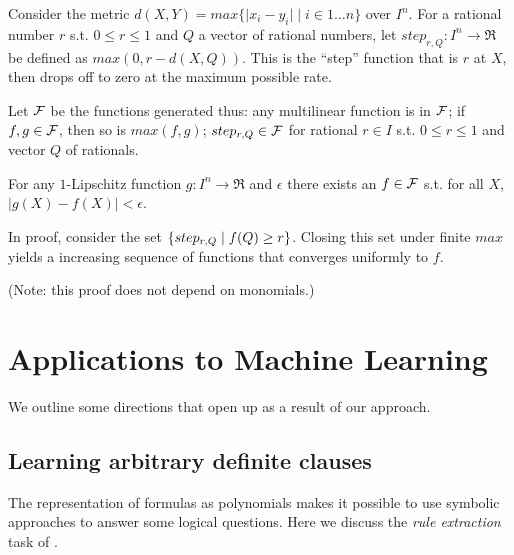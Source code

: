 \documentclass{article} %
\begin{document}
Consider the metric \(d(X,Y) = max \{\lvert x_i - y_i \rvert \mid i\in 1\ldots n \}\) over \(I^n\). For a 
rational number \(r\) s.t. \(0 \leq r \leq 1\) and \(Q\) a vector of rational numbers, let \(step_{r,Q}:I^n \rightarrow \Re\) be defined as \(max(0, r-d(X,Q))\). This is the ``step'' function that is \(r\) at \(X\), then drops off to zero at the maximum possible rate. 

\begin{definition}
  Let \(\cal F\) be the functions generated thus: any multilinear function is in \(\cal F\); if \(f,g \in {\cal F}\), then so is \(max(f,g)\); \(step_{r,Q} \in {\cal F}\) for rational \(r \in I\) s.t. \(0 \leq r \leq 1\) and vector \(Q\) of rationals.
\end{definition}

\begin{theorem}
  For any \(1\)-Lipschitz function \(g:I^n \rightarrow \Re\) and \(\epsilon\) there exists an \(f \in {\cal F}\) s.t. for all \(X\), \(\lvert g(X)-f(X) \rvert \lt \epsilon\).
\end{theorem}
In proof, consider the set \(\{ step_{r,Q} \alt f(Q) \ge r \}\). Closing this set under finite \(max\) yields a increasing sequence of functions that converges uniformly to \(f\).

(Note: this proof does not depend on monomials.)

\section{Applications to Machine Learning}


We outline some directions that open up as a result of our approach.

\subsection{Learning arbitrary definite clauses}
The representation of formulas as polynomials makes it possible to use symbolic approaches to answer some logical questions. Here we discuss the {\em rule extraction} task of \cite[Algorithm 1]{bishan-iclr15}.
\end{document}
